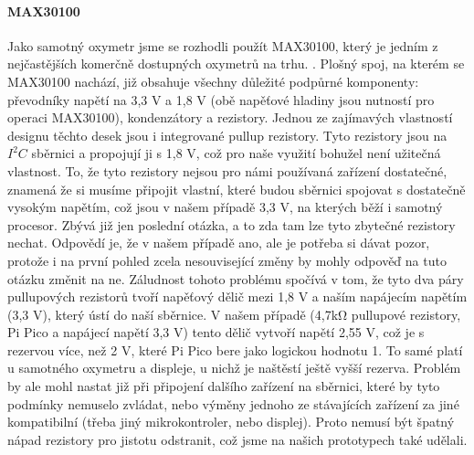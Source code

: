 \paragraph{MAX30100}
Jako samotný oxymetr jsme se rozhodli použít MAX30100, který je jedním z nejčastějších komerčně dostupných oxymetrů na trhu. \citep{max30100}. Plošný spoj, na kterém se MAX30100 nachází, již obsahuje všechny důležité podpůrné komponenty: převodníky napětí na 3,3 V a 1,8 V (obě napěťové hladiny jsou nutností pro operaci MAX30100), kondenzátory a rezistory. Jednou ze zajímavých vlastností designu těchto desek jsou i integrované pullup rezistory. Tyto rezistory jsou na $I^2C$ sběrnici a propojují ji s 1,8 V, což pro naše využití bohužel není užitečná vlastnost. To, že tyto rezistory nejsou pro námi používaná zařízení dostatečné, znamená že si musíme připojit vlastní, které budou sběrnici spojovat s dostatečně vysokým napětím, což jsou v našem případě 3,3 V, na kterých běží i samotný procesor. Zbývá již jen poslední otázka, a to zda tam lze tyto zbytečné rezistory nechat. Odpovědí je, že v našem případě ano, ale je potřeba si dávat pozor, protože i na první pohled zcela nesouvisející změny by mohly odpověď na tuto otázku změnit na ne. Záludnost tohoto problému spočívá v tom, že tyto dva páry pullupových rezistorů tvoří napěťový dělič mezi 1,8 V a naším napájecím napětím (3,3 V), který ústí do naší sběrnice. V našem případě (4,7kΩ pullupové rezistory, Pi Pico a napájecí napětí 3,3 V) tento dělič vytvoří napětí 2,55 V, což je s rezervou více, než 2 V, které Pi Pico bere jako logickou hodnotu 1. To samé platí u samotného oxymetru a displeje, u nichž je naštěstí ještě vyšší rezerva. Problém by ale mohl nastat již při připojení dalšího zařízení na sběrnici, které by tyto podmínky nemuselo zvládat, nebo výměny jednoho ze stávajících zařízení za jiné kompatibilní (třeba jiný mikrokontroler, nebo displej). Proto nemusí být špatný nápad rezistory pro jistotu odstranit, což jsme na našich prototypech také udělali.
